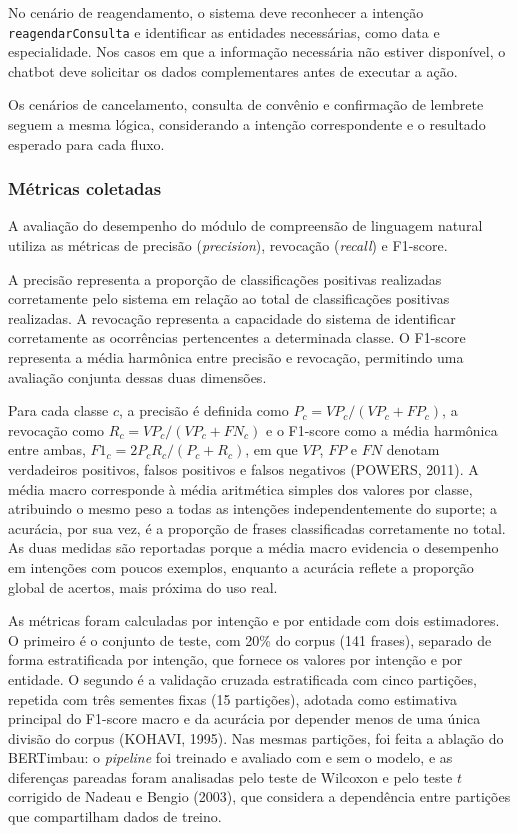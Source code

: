 \documentclass[12pt,a4paper]{extarticle}
\begin{document}
No cenário de reagendamento, o sistema deve reconhecer a intenção \newline \texttt{reagendarConsulta} e identificar as entidades necessárias, como data e especialidade. Nos casos em que a informação necessária não estiver disponível, o chatbot deve solicitar os dados complementares antes de executar a ação.

Os cenários de cancelamento, consulta de convênio e confirmação de lembrete seguem a mesma lógica, considerando a intenção correspondente e o resultado esperado para cada fluxo.

\subsubsection{Métricas coletadas}
\label{sec:metricas-metodo}

A avaliação do desempenho do módulo de compreensão de linguagem natural utiliza as métricas de precisão (\textit{precision}), revocação (\textit{recall}) e F1-score.

A precisão representa a proporção de classificações positivas realizadas corretamente pelo sistema em relação ao total de classificações positivas realizadas. A revocação representa a capacidade do sistema de identificar corretamente as ocorrências pertencentes a determinada classe. O F1-score representa a média harmônica entre precisão e revocação, permitindo uma avaliação conjunta dessas duas dimensões.

Para cada classe $c$, a precisão é definida como $P_c = VP_c/(VP_c + FP_c)$, a revocação como $R_c = VP_c/(VP_c + FN_c)$ e o F1-score como a média harmônica entre ambas, $F1_c = 2P_cR_c/(P_c + R_c)$, em que $VP$, $FP$ e $FN$ denotam verdadeiros positivos, falsos positivos e falsos negativos (POWERS, 2011). A média macro corresponde à média aritmética simples dos valores por classe, atribuindo o mesmo peso a todas as intenções independentemente do suporte; a acurácia, por sua vez, é a proporção de frases classificadas corretamente no total. As duas medidas são reportadas porque a média macro evidencia o desempenho em intenções com poucos exemplos, enquanto a acurácia reflete a proporção global de acertos, mais próxima do uso real.

As métricas foram calculadas por intenção e por entidade com dois estimadores. O primeiro é o conjunto de teste, com 20\% do corpus (141 frases), separado de forma estratificada por intenção, que fornece os valores por intenção e por entidade. O segundo é a validação cruzada estratificada com cinco partições, repetida com três sementes fixas (15 partições), adotada como estimativa principal do F1-score macro e da acurácia por depender menos de uma única divisão do corpus (KOHAVI, 1995). Nas mesmas partições, foi feita a ablação do BERTimbau: o \textit{pipeline} foi treinado e avaliado com e sem o modelo, e as diferenças pareadas foram analisadas pelo teste de Wilcoxon e pelo teste $t$ corrigido de Nadeau e Bengio (2003), que considera a dependência entre partições que compartilham dados de treino.
\end{document}
